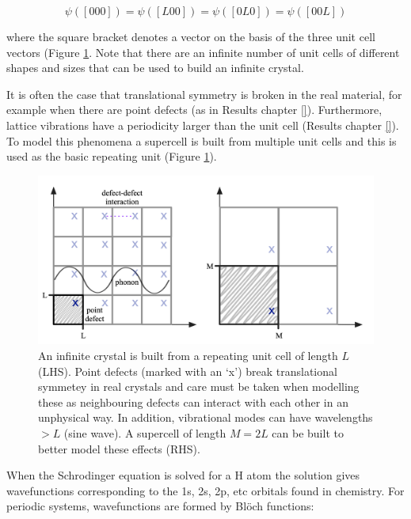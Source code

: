 \begin{equation}
\psi([0 0 0]) = \psi([L 0 0]) =  \psi([ 0 L 0]) = \psi([0 0 L])
\end{equation}

where the square bracket denotes a vector on the basis of the three unit cell vectors (Figure \ref{translational}. Note that there are an infinite number of unit cells of different shapes and sizes that can be used to build an infinite crystal.

It is often the case that translational symmetry is broken in the real material, for example when there are point defects (as in Results chapter \ref{}). Furthermore, lattice vibrations have a periodicity larger than the unit cell (Results chapter \ref{}). To model this phenomena a supercell is built from multiple unit cells and this is used as the basic repeating unit (Figure \ref{translational}).

\begin{figure}[h]
\centering
  \includegraphics[resolution=450]{figures/ch3/supercell.png}
  \caption[Translational symmetry and supercell construction]{An infinite crystal is built from a repeating unit cell of length $L$ (LHS). Point defects (marked with an `x') break translational symmetey in real crystals and care must be taken when modelling these as neighbouring defects can interact with each other in an unphysical way. In addition, vibrational modes can have wavelengths $>L$ (sine wave). A supercell of length $M=2L$ can be built to better model these effects (RHS). } 
  \label{translational}
\end{figure}

When the Schrodinger equation is solved for a H atom the solution gives wavefunctions corresponding to the 1s, 2s, 2p, etc orbitals found in chemistry. For periodic systems, wavefunctions are formed by Bl\"{o}ch functions:\autocite{Hoffman1987}

